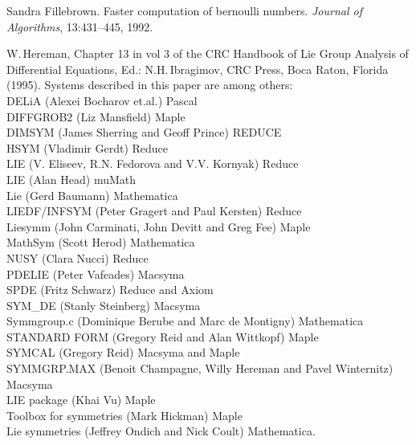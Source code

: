 

\begin{thebibliography}{999}

Sandra Fillebrown.
\newblock Faster computation of bernoulli numbers.
\newblock \emph{Journal of Algorithms}, 13:431--445, 1992.



 W.\,Hereman, Chapter 13 in vol 3 of the CRC Handbook of
Lie Group Analysis of Differential Equations, Ed.: N.H.\,Ibragimov,
CRC Press, Boca Raton, Florida (1995).
Systems described in this paper are among others:  \\
DELiA (Alexei Bocharov et.al.) Pascal \\
DIFFGROB2 (Liz Mansfield) Maple \\
DIMSYM (James Sherring and Geoff Prince) REDUCE \\
HSYM (Vladimir Gerdt) Reduce \\
LIE (V. Eliseev, R.N. Fedorova and V.V. Kornyak) Reduce \\
LIE (Alan Head) muMath \\
Lie (Gerd Baumann) Mathematica \\
LIEDF/INFSYM (Peter Gragert and Paul Kersten) Reduce \\
Liesymm (John Carminati, John Devitt and Greg Fee) Maple \\
MathSym (Scott Herod) Mathematica \\
NUSY (Clara Nucci) Reduce \\
PDELIE (Peter Vafeades) Macsyma \\
SPDE (Fritz Schwarz) Reduce and Axiom \\
SYM\_DE (Stanly Steinberg) Macsyma \\
Symmgroup.c (Dominique Berube and Marc de Montigny) Mathematica \\
STANDARD FORM (Gregory Reid and Alan Wittkopf) Maple \\
SYMCAL (Gregory Reid) Macsyma and Maple \\
SYMMGRP.MAX (Benoit Champagne, Willy Hereman and Pavel Winternitz) Macsyma \\
LIE package (Khai Vu) Maple \\
Toolbox for symmetries (Mark Hickman) Maple \\
Lie symmetries (Jeffrey Ondich and Nick Coult) Mathematica.


\end{thebibliography}
